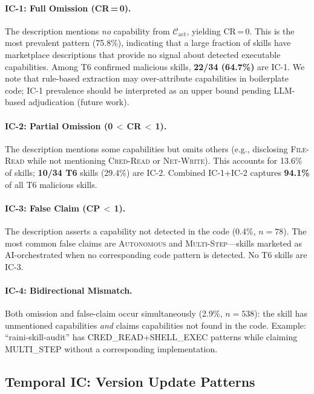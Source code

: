 \paragraph{IC-1: Full Omission (CR\,=\,0).}
The description mentions \emph{no} capability from $\mathcal{C}_{\text{act}}$,
yielding CR\,=\,0.
This is the most prevalent pattern (75.8\%),
indicating that a large fraction of skills have marketplace descriptions
that provide no signal about detected executable capabilities.
Among T6 confirmed malicious skills, \textbf{22/34 (64.7\%)} are IC-1.
We note that rule-based extraction may over-attribute capabilities in
boilerplate code; IC-1 prevalence should be interpreted as an upper bound
pending LLM-based adjudication (future work).

\paragraph{IC-2: Partial Omission (0\,$<$\,CR\,$<$\,1).}
The description mentions some capabilities but omits others
(e.g., disclosing \textsc{File-Read}
while not mentioning \textsc{Cred-Read} or \textsc{Net-Write}).
This accounts for 13.6\% of skills;
\textbf{10/34 T6} skills (29.4\%) are IC-2.
Combined IC-1+IC-2 captures \textbf{94.1\%} of all T6 malicious skills.

\paragraph{IC-3: False Claim (CP\,$<$\,1).}
The description asserts a capability not detected in the code (0.4\%, $n{=}78$).
The most common false claims are
\textsc{Autonomous} and \textsc{Multi-Step}---skills marketed
as AI-orchestrated when no corresponding code pattern is detected.
No T6 skills are IC-3.

\paragraph{IC-4: Bidirectional Mismatch.}
Both omission and false-claim occur simultaneously (2.9\%, $n{=}538$):
the skill has unmentioned capabilities \emph{and} claims capabilities
not found in the code.
Example: ``raini-skill-audit'' has CRED\_READ+SHELL\_EXEC patterns
while claiming MULTI\_STEP without a corresponding implementation.

\subsection{Temporal IC: Version Update Patterns}
\label{sec:temporal_ic}

